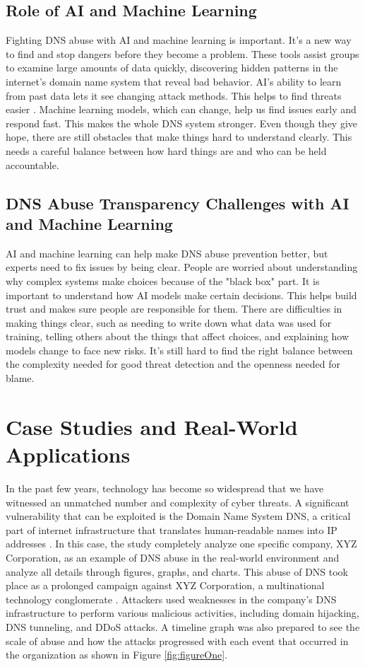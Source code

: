 \subsection{Role of AI and Machine Learning}

Fighting DNS abuse with AI and machine learning is important. It's a new way to find and stop dangers before they become a problem. These tools assist groups to examine large amounts of data quickly, discovering hidden patterns in the internet's domain name system that reveal bad behavior. AI's ability to learn from past data lets it see changing attack methods. This helps to find threats easier \cite{tariq2023critical}. Machine learning models, which can change, help us find issues early and respond fast. This makes the whole DNS system stronger. Even though they give hope, there are still obstacles that make things hard to understand clearly. This needs a careful balance between how hard things are and who can be held accountable.

\subsection{DNS Abuse Transparency Challenges with AI and Machine Learning}

AI and machine learning can help make DNS abuse prevention better, but experts need to fix issues by being clear. People are worried about understanding why complex systems make choices because of the "black box" part. It is important to understand how AI models make certain decisions. This helps build trust and makes sure people are responsible for them. There are difficulties in making things clear, such as needing to write down what data was used for training, telling others about the things that affect choices, and explaining how models change to face new risks. It's still hard to find the right balance between the complexity needed for good threat detection and the openness needed for blame.

\section{Case Studies and Real-World Applications}

In the past few years, technology has become so widespread that we have witnessed an unmatched number and complexity of cyber threats. A significant vulnerability that can be exploited is the Domain Name System DNS, a critical part of internet infrastructure that translates human-readable names into IP addresses \cite{kumari2021sac115}. In this case, the study completely analyze one specific company, XYZ Corporation, as an example of DNS abuse in the real-world environment and analyze all details through figures, graphs, and charts. This abuse of DNS took place as a prolonged campaign against XYZ Corporation, a multinational technology conglomerate \cite{mohammed2021network}. Attackers used weaknesses in the company's DNS infrastructure to perform various malicious activities, including domain hijacking, DNS tunneling, and DDoS attacks. A timeline graph was also prepared to see the scale of abuse and how the attacks progressed with each event that occurred in the organization as shown in Figure \ref{fig:figureOne}.

